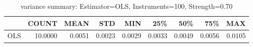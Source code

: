 \begin{table}[ht]
\centering
\caption{variance summary: Estimator=OLS, Instruments=100, Strength=0.70}
\begin{tabular}{lrrrrrrrr}
\toprule
 & COUNT & MEAN & STD & MIN & 25\% & 50\% & 75\% & MAX \\
\midrule
OLS & 10.0000 & 0.0051 & 0.0023 & 0.0029 & 0.0033 & 0.0049 & 0.0056 & 0.0105 \\
\bottomrule
\end{tabular}
\end{table}
